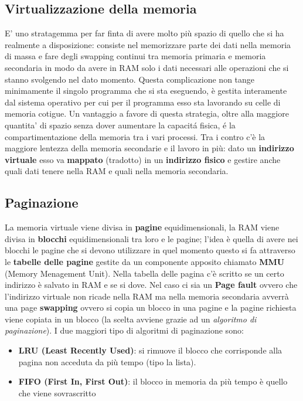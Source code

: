 \documentclass{article}
\begin{document}
\subsection{Virtualizzazione della memoria}
E' uno stratagemma per far finta di avere molto più spazio di quello che si ha realmente a disposizione: consiste nel memorizzare parte dei dati nella memoria di massa e fare degli swapping continui tra memoria primaria e memoria secondaria in modo da avere in RAM solo i dati necessari alle operazioni che si stanno svolgendo nel dato momento. Questa complicazione non tange minimamente il singolo programma che si sta eseguendo, è gestita interamente dal sistema operativo per cui per il programma esso sta lavorando su celle di memoria cotigue. Un vantaggio a favore di questa strategia, oltre alla maggiore quantita' di spazio senza dover aumentare la capacitá fisica, é la compartimentazione della memoria tra i vari processi. Tra i contro c'è la maggiore lentezza della memoria secondarie e il lavoro in più: dato un \textbf{indirizzo virtuale} esso va \textbf{mappato} (tradotto) in un \textbf{indirizzo fisico} e gestire anche quali dati tenere nella RAM e quali nella memoria secondaria.
\subsection{Paginazione}
La memoria virtuale viene divisa in \textbf{pagine} equidimensionali, la RAM viene divisa in \textbf{blocchi} equidimensionali tra loro e le pagine; l'idea è quella di avere nei blocchi le pagine che si devono utilizzare in quel momento questo si fa attraverso le \textbf{tabelle delle pagine} gestite da un componente apposito chiamato \textbf{MMU} (Memory Menagement Unit). Nella tabella delle pagina c'è scritto se un certo indirizzo è salvato in RAM e se si dove. Nel caso ci sia un \textbf{Page fault} ovvero che l'indirizzo virtuale non ricade nella RAM ma nella memoria secondaria avverrà una page \textbf{swapping} ovvero si copia un blocco in una pagine e la pagine richiesta viene copiata in un blocco (la scelta avviene grazie ad un \textit{algoritmo di paginazione}). I due maggiori tipo di algoritmi di paginazione sono: \begin{itemize}
    \item \textbf{LRU (Least Recently Used)}: si rimuove il blocco che corrisponde alla pagina non acceduta da più tempo (tipo la lista). 
    \item \textbf{FIFO (First In, First Out)}: il blocco in memoria da più tempo è quello che viene sovrascritto
\end{itemize}
\end{document}
